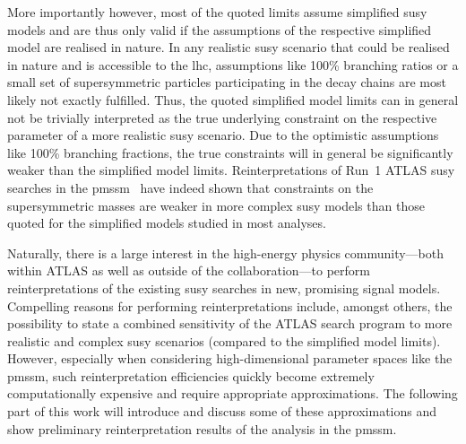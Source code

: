 More importantly however, most of the quoted limits assume simplified \gls{susy} models and are thus only valid if the assumptions of the respective simplified model are realised in nature. 
In any realistic \gls{susy} scenario that could be realised in nature and is accessible to the \gls{lhc}, assumptions like 100\% branching ratios or a small set of supersymmetric particles participating in the decay chains are most likely not exactly fulfilled. 
Thus, the quoted simplified model limits can in general not be trivially interpreted as the true underlying constraint on the respective parameter of a more realistic \gls{susy} scenario. 
Due to the optimistic assumptions like 100\% branching fractions, the true constraints will in general be significantly weaker than the simplified model limits.
Reinterpretations of Run~1 ATLAS \gls{susy} searches in the \gls{pmssm}~\cite{pMSSM-scan-run1:2015baa} have indeed shown that constraints on the supersymmetric masses are weaker in more complex \gls{susy} models than those quoted for the simplified models studied in most analyses.

Naturally, there is a large interest in the high-energy physics community---both within ATLAS as well as outside of the collaboration---to perform reinterpretations of the existing \gls{susy} searches in new, promising signal models. Compelling reasons for performing reinterpretations include, amongst others, the possibility to state a combined sensitivity of the ATLAS search program to more realistic and complex \gls{susy} scenarios (compared to the simplified model limits). However, especially when considering high-dimensional parameter spaces like the \gls{pmssm}, such reinterpretation efficiencies quickly become extremely computationally expensive and require appropriate approximations. The following part of this work will introduce and discuss some of these approximations and show preliminary reinterpretation results of the analysis in the \gls{pmssm}.


